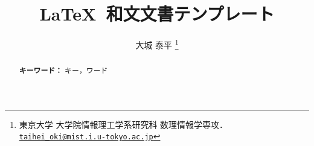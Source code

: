 \documentclass[11pt, a4paper, dvipdfmx, uplatex]{jsarticle}
\title{\LaTeX\ 和文文書テンプレート}
\author{大城 泰平%
  \texorpdfstring{\thanks{
    東京大学 大学院情報理工学系研究科 数理情報学専攻．
    \href{mailto:taihei_oki@mist.i.u-tokyo.ac.jp}{\nolinkurl{taihei_oki@mist.i.u-tokyo.ac.jp}}
  }}{}
}
\newcommand{\mykeywords}{キー，ワード}
\begin{document}
\maketitle

\begin{abstract}
  

  \bigskip\noindent\textbf{キーワード：} \mykeywords{}
\end{abstract}





\end{document}

